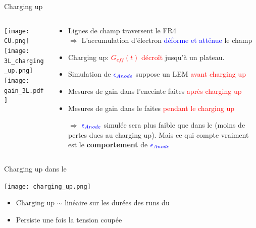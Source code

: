     \begin{frame}{Charging up}
    	\begin{scriptsize}
    		\begin{columns}
    			\begin{column}{0.5\textwidth}
    				\texttt{[image: CU.png]}\\
                    \vspace{0.1cm}
    				\texttt{[image: 3L\_charging\_up.png]}\\
    				\texttt{[image: gain\_3L.pdf]}
    			\end{column}\hfill
    			\begin{column}{0.5\textwidth}
    				\begin{itemize}
    					\item Lignes de champ traversent le FR4\\
    					$\Rightarrow$ L'accumulation d'électron \textcolor{blue}{déforme et atténue} le champ
    					\item Charging up: \textcolor{red}{$G_{eff}(t)$ décroît} jusqu'à un plateau.
    				\end{itemize}
    				\vspace{0.3cm}
    				\begin{itemize}
    					\item Simulation de $\textcolor{blue}{\epsilon_{Anode}}$ suppose un LEM \textcolor{red}{avant charging up}
    					\item Mesures de gain dans l'enceinte faites \textcolor{red}{après charging up}
    					\item Mesures de gain dans le \TOO{} faites \textcolor{red}{pendant le charging up}
    					\item[$\Rightarrow$] $\textcolor{blue}{\epsilon_{Anode}}$ simulée sera plus faible que dans le \TOO{} (moins de pertes dues au charging up). Mais ce qui compte vraiment est le \textbf{comportement} de $\textcolor{blue}{\epsilon_{Anode}}$
    				\end{itemize}
    			\end{column}
    		\end{columns}
    	\end{scriptsize}
    \end{frame}

   \begin{frame}{Charging up dans le \TOO{}}
        \begin{scriptsize}
            \texttt{[image: charging\_up.png]}
            \begin{itemize}
                \item Charging up $\sim$ linéaire sur les durées des runs du \TOO{}
                \item Persiste une fois la tension coupée
            \end{itemize}
        \end{scriptsize}
    \end{frame}

